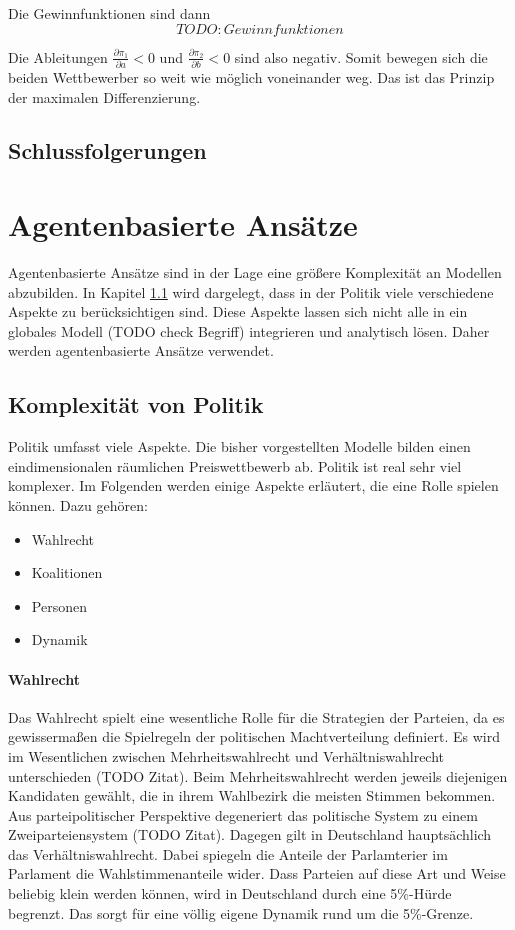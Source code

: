 Die Gewinnfunktionen sind dann
\begin{equation}
TODO: Gewinnfunktionen
\end{equation}

Die Ableitungen $\frac{\partial \pi_1}{\partial a}<0$ und $\frac{\partial \pi_2}{\partial b}<0$ sind also negativ. Somit bewegen sich die beiden Wettbewerber so weit wie möglich voneinander weg. Das ist das Prinzip der maximalen Differenzierung.

\subsection{Schlussfolgerungen}

\section{Agentenbasierte Ansätze}\label{Sec-ABM}
Agentenbasierte Ansätze sind in der Lage eine größere Komplexität an Modellen abzubilden. In Kapitel \ref{sec:ABM-Komplexität} wird dargelegt, dass in der Politik viele verschiedene Aspekte zu berücksichtigen sind. Diese Aspekte lassen sich nicht alle in ein globales Modell (TODO check Begriff) integrieren und analytisch lösen. Daher werden agentenbasierte Ansätze verwendet.

\subsection{Komplexität von Politik} \label{sec:ABM-Komplexität}
Politik umfasst viele Aspekte. Die bisher vorgestellten Modelle bilden einen eindimensionalen räumlichen Preiswettbewerb ab. Politik ist real sehr viel komplexer. Im Folgenden werden einige Aspekte erläutert, die eine Rolle spielen können. Dazu gehören:
\begin{itemize}
	\item Wahlrecht
	\item Koalitionen
	\item Personen
	\item Dynamik
\end{itemize}

\paragraph{Wahlrecht}
Das Wahlrecht spielt eine wesentliche Rolle für die Strategien der Parteien, da es gewissermaßen die Spielregeln der politischen Machtverteilung definiert. Es wird im Wesentlichen zwischen Mehrheitswahlrecht und Verhältniswahlrecht unterschieden (TODO Zitat). Beim Mehrheitswahlrecht werden jeweils diejenigen Kandidaten gewählt, die in ihrem Wahlbezirk die meisten Stimmen bekommen. Aus parteipolitischer Perspektive degeneriert das politische System zu einem Zweiparteiensystem (TODO Zitat). Dagegen gilt in Deutschland hauptsächlich das Verhältniswahlrecht. Dabei spiegeln die Anteile der Parlamterier im Parlament die Wahlstimmenanteile wider. Dass Parteien auf diese Art und Weise beliebig klein werden können, wird in Deutschland durch eine 5\%-Hürde begrenzt. Das sorgt für eine völlig eigene Dynamik rund um die 5\%-Grenze.

